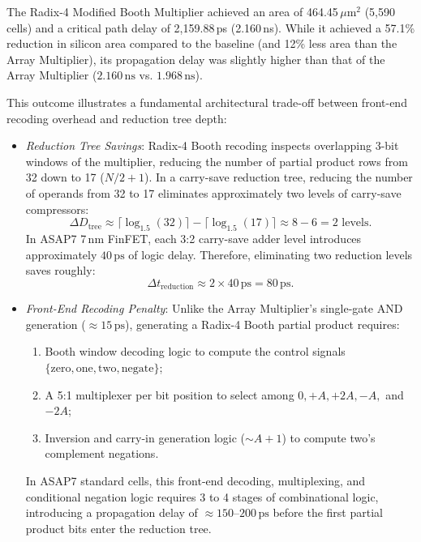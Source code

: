 The Radix-4 Modified Booth Multiplier achieved an area of 464.45\,$\mu$m$^2$ (5,590 cells) and a critical path delay of 2,159.88\,ps (2.160\,ns). While it achieved a 57.1\% reduction in silicon area compared to the baseline (and 12\% less area than the Array Multiplier), its propagation delay was slightly higher than that of the Array Multiplier ($2.160\,\text{ns}$ vs. $1.968\,\text{ns}$).

This outcome illustrates a fundamental architectural trade-off between front-end recoding overhead and reduction tree depth:
\begin{itemize}
    \item \textit{Reduction Tree Savings}: Radix-4 Booth recoding inspects overlapping 3-bit windows of the multiplier, reducing the number of partial product rows from 32 down to 17 ($N/2 + 1$). In a carry-save reduction tree, reducing the number of operands from 32 to 17 eliminates approximately two levels of carry-save compressors:
    \begin{equation}
    \Delta D_{\text{tree}} \approx \lceil \log_{1.5}(32) \rceil - \lceil \log_{1.5}(17) \rceil \approx 8 - 6 = 2 \text{ levels}.
    \end{equation}
    In ASAP7 7\,nm FinFET, each 3:2 carry-save adder level introduces approximately $40\,\text{ps}$ of logic delay. Therefore, eliminating two reduction levels saves roughly:
    \begin{equation}
    \Delta t_{\text{reduction}} \approx 2 \times 40\,\text{ps} = 80\,\text{ps}.
    \end{equation}
    
    \item \textit{Front-End Recoding Penalty}: Unlike the Array Multiplier's single-gate AND generation ($\approx 15\,\text{ps}$), generating a Radix-4 Booth partial product requires:
    \begin{enumerate}
        \item Booth window decoding logic to compute the control signals $\{ \text{zero}, \text{one}, \text{two}, \text{negate} \}$;
        \item A 5:1 multiplexer per bit position to select among $0, +A, +2A, -A,$ and $-2A$;
        \item Inversion and carry-in generation logic ($\sim A + 1$) to compute two's complement negations.
    \end{enumerate}
    In ASAP7 standard cells, this front-end decoding, multiplexing, and conditional negation logic requires 3 to 4 stages of combinational logic, introducing a propagation delay of \textbf{$\approx 150\text{--}200\,\text{ps}$} before the first partial product bits enter the reduction tree.
    

\end{itemize}
